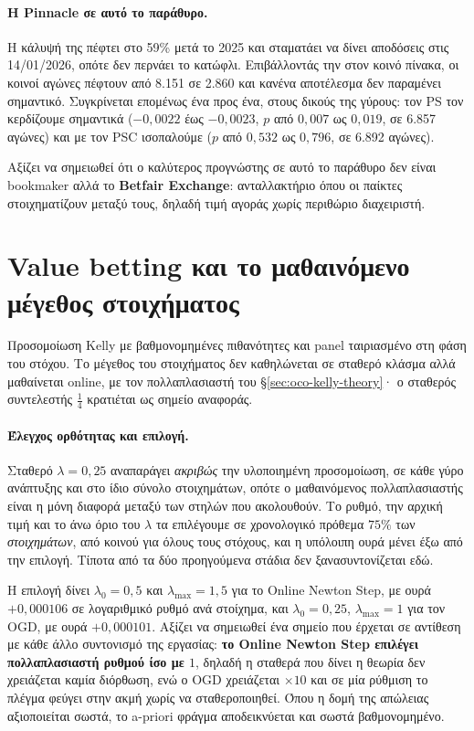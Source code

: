 \documentclass[12pt,a4paper,oneside]{report}
\renewcommand{\_}{\oldunderscore\allowbreak}
\theoremstyle{definition}
\theoremstyle{plain}
\theoremstyle{remark}
\begin{document}
\paragraph{Η Pinnacle σε αυτό το παράθυρο.} Η κάλυψή της πέφτει στο 59\% μετά το 2025 και
σταματάει να δίνει αποδόσεις στις 14/01/2026, οπότε δεν περνάει το κατώφλι. Επιβάλλοντάς την
στον κοινό πίνακα, οι κοινοί αγώνες πέφτουν από 8.151 σε 2.860 και κανένα αποτέλεσμα δεν
παραμένει σημαντικό. Συγκρίνεται επομένως ένα προς ένα, στους δικούς της γύρους: τον PS τον
κερδίζουμε σημαντικά ($-0{,}0022$ έως $-0{,}0023$, $p$ από $0{,}007$ ως $0{,}019$, σε 6.857
αγώνες) και με τον PSC ισοπαλούμε ($p$ από $0{,}532$ ως $0{,}796$, σε 6.892 αγώνες).

Αξίζει να σημειωθεί ότι ο καλύτερος προγνώστης σε αυτό το παράθυρο δεν είναι bookmaker αλλά
το \textbf{Betfair Exchange}: ανταλλακτήριο όπου οι παίκτες στοιχηματίζουν μεταξύ τους,
δηλαδή τιμή αγοράς χωρίς περιθώριο διαχειριστή.

\section{Value betting και το μαθαινόμενο μέγεθος στοιχήματος}
\label{sec:res-value}

Προσομοίωση Kelly με βαθμονομημένες πιθανότητες και panel ταιριασμένο στη φάση του στόχου.
Το μέγεθος του στοιχήματος δεν καθηλώνεται σε σταθερό κλάσμα αλλά μαθαίνεται online, με τον
πολλαπλασιαστή του \S\ref{sec:oco-kelly-theory}· ο σταθερός συντελεστής $\tfrac14$ κρατιέται
ως σημείο αναφοράς.

\paragraph{Έλεγχος ορθότητας και επιλογή.} Σταθερό $\lambda = 0{,}25$ αναπαράγει
\emph{ακριβώς} την υλοποιημένη προσομοίωση, σε κάθε γύρο ανάπτυξης και στο ίδιο σύνολο
στοιχημάτων, οπότε ο μαθαινόμενος πολλαπλασιαστής είναι η μόνη διαφορά μεταξύ των στηλών που
ακολουθούν. Το ρυθμό, την αρχική τιμή και το άνω όριο του $\lambda$ τα επιλέγουμε σε
χρονολογικό πρόθεμα $75\%$ των \emph{στοιχημάτων}, από κοινού για όλους τους στόχους, και η
υπόλοιπη ουρά μένει έξω από την επιλογή. Τίποτα από τα δύο προηγούμενα στάδια δεν
ξανασυντονίζεται εδώ.

Η επιλογή δίνει $\lambda_0 = 0{,}5$ και $\lambda_{\max} = 1{,}5$ για το Online Newton Step,
με ουρά $+0{,}000106$ σε λογαριθμικό ρυθμό ανά στοίχημα, και $\lambda_0 = 0{,}25$,
$\lambda_{\max} = 1$ για τον OGD, με ουρά $+0{,}000101$. Αξίζει να σημειωθεί ένα σημείο που
έρχεται σε αντίθεση με κάθε άλλο συντονισμό της εργασίας: \textbf{το Online Newton Step
επιλέγει πολλαπλασιαστή ρυθμού ίσο με $1$}, δηλαδή η σταθερά που δίνει η θεωρία δεν
χρειάζεται καμία διόρθωση, ενώ ο OGD χρειάζεται $\times 10$ και σε μία ρύθμιση το πλέγμα
φεύγει στην ακμή χωρίς να σταθεροποιηθεί. Όπου η δομή της απώλειας αξιοποιείται σωστά, το
a-priori φράγμα αποδεικνύεται και σωστά βαθμονομημένο.
\end{document}
